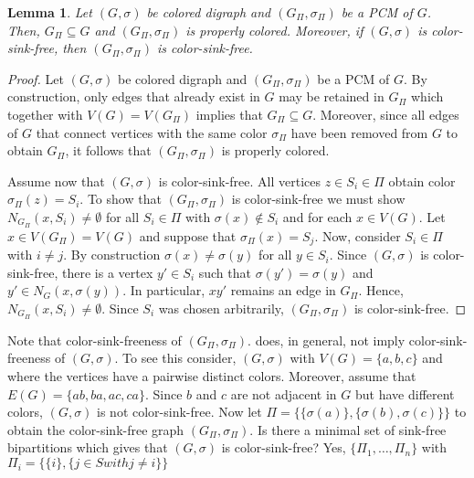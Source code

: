 \documentclass[final,3p,times]{elsarticle}
\newtheorem{lemma}[theorem]{Lemma}%
\newcommand{\ak}[1]{\begingroup\color{orange}#1\endgroup}
\begin{document}
\begin{lemma}\label{lem:basicsPCM}
  Let $(G,\sigma)$ be colored digraph and $(G_{\Pi},\sigma_{\Pi})$ 
  be a PCM of $G$. Then, $G_\Pi  \subseteq G$ and 
  $(G_{\Pi},\sigma_{\Pi})$ is properly colored. 
  Moreover, if $(G,\sigma)$ is color-sink-free, 
  then $(G_{\Pi},\sigma_{\Pi})$ is color-sink-free.
\end{lemma}
\begin{proof}
 	Let $(G,\sigma)$ be colored digraph and $(G_{\Pi},\sigma_{\Pi})$ 
  be a PCM of $G$. By construction, only edges that already
  exist in $G$ may be retained in $G_\Pi$ which together
  with $V(G) = V(G_\Pi)$ implies that $G_\Pi  \subseteq G$.
  Moreover, since all edges of $G$ that connect vertices 
  with the same color $\sigma_\Pi$ have been removed
  from $G$ to obtain $G_\Pi$, it follows that 
  $(G_{\Pi},\sigma_{\Pi})$ is properly colored. 
  
  Assume now that $(G,\sigma)$ is color-sink-free. 
  All vertices $z\in S_i\in \Pi$ obtain color
 $\sigma_\Pi(z)=S_i$. To show that $(G_\Pi,\sigma_\Pi)$ is color-sink-free we
	must show $N_{G_\Pi}(x,S_i)\neq \emptyset$ for all $S_i\in \Pi$ with $\sigma(x)\notin S_i$ and 
	for each $x\in V(G)$. Let $x\in V(G_\Pi)=V(G)$
	and suppose that  $\sigma_\Pi(x) = S_j$.  Now,
	consider $S_i\in \Pi$ with $i\neq j$. By construction $\sigma(x)\neq
	\sigma(y)$ for all $y\in S_i$. Since $(G,\sigma)$ is color-sink-free, there
	is a vertex $y'\in S_i$ such that $\sigma(y')=\sigma(y)$ and $y'\in
	N_G(x,\sigma(y))$. In particular, $xy'$ remains an edge in $G_\Pi$. Hence,
	$N_{G_\Pi}(x,S_i)\neq \emptyset$. Since $S_i$ was chosen arbitrarily,
	$(G_\Pi,\sigma_\Pi)$ is color-sink-free.
 \end{proof}

Note that color-sink-freeness of  $(G_{\Pi},\sigma_{\Pi})$.
does, in general, not imply  color-sink-freeness of  $(G,\sigma)$.
To see this consider,  $(G,\sigma)$ with $V(G) = \{a,b,c\}$
and where the vertices have a pairwise distinct colors. 
Moreover, assume that $E(G) = \{ab,ba,ac,ca\}$. 
Since $b$ and $c$ are not adjacent in $G$ but have different
colors,  $(G,\sigma)$ is not color-sink-free. 
Now let $\Pi = \{\{\sigma(a)\},\{\sigma(b),\sigma(c)\}\}$
to obtain the color-sink-free graph $(G_{\Pi},\sigma_{\Pi})$.
\ak{Is there a minimal set of sink-free bipartitions which gives that $(G,\sigma)$ is color-sink-free? Yes, $\{\Pi_1,\ldots, \Pi_n\}$ with $\Pi_i=\{\{i\},\{j\in S with j\neq i\}\}$}
\end{document}

